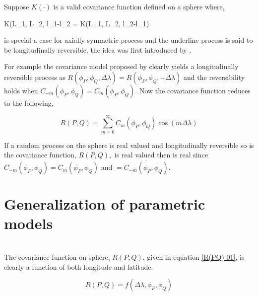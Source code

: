 			
	Suppose $K(\cdot)$ is a valid covariance function defined on a sphere where,

		\beq
		K(L_1, L_2, l_1-l_2 = K(L_1, L_2, l_2-l_1)
		\eeq

is special a case for axially symmetric process and the underline process is said to be longitudinally reversible, the idea was first introduced by \cite{Stein2007}.  

For example the covariance model proposed by \cite{Huang2012} clearly yields a longitudinally reversible process as $R(\phi_P, \phi_Q, \Delta\lambda) = R(\phi_P, \phi_Q, -\Delta\lambda)$ and the reversibility holds when $C_{-m}(\phi_P,\phi_Q)=C_m(\phi_P,\phi_Q)$. Now the covariance function reduces to the following,  

\[
R(P,Q) = \sum_{m=0}^{\infty} C_m(\phi_P,\phi_Q)\cos(m\Delta\lambda)
\]

If a random process on the sphere is real valued and longitudinally reversible so is the covariance function, $R(P,Q),$ is real valued then \Cm is real since $C_{-m}(\phi_P,\phi_Q)=C_m(\phi_P,\phi_Q)$  and \Cm $= \overline{C_{-m}(\phi_P,\phi_Q)}$.

	
	\section{Generalization of parametric models}
		
	 \\
		
	The covariance function on sphere, $R(P,Q)$,  given in equation \ref{R(PQ)-01}, is clearly a function of both longitude and latitude. 
	
	\[
		R(P,Q) = f(\Delta\lambda, \phi_P,\phi_Q)
	\]
		
